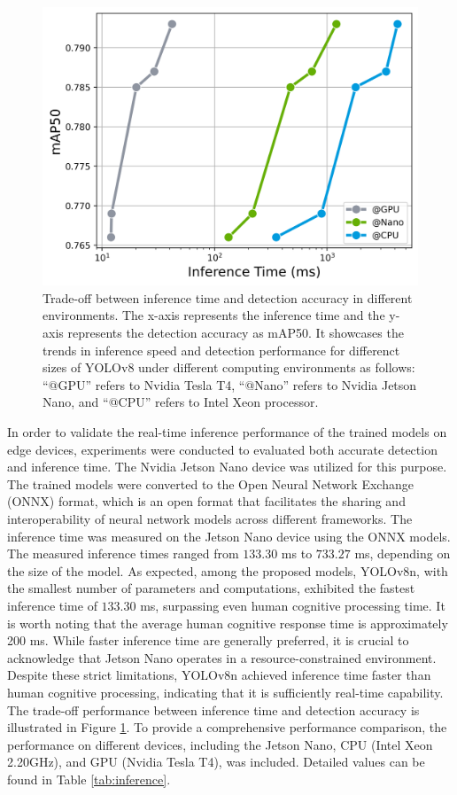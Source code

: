 \begin{figure}[!t]
    \includegraphics[scale=0.5]{fig/plot_inference_time.png}
    \caption{Trade-off between inference time and detection accuracy in different environments. The x-axis represents the inference time and the y-axis represents the detection accuracy as mAP50. It showcases the trends in inference speed and detection performance for differenct sizes of YOLOv8 under different computing environments as follows: ``@GPU'' refers to Nvidia Tesla T4, ``@Nano'' refers to Nvidia Jetson Nano, and ``@CPU'' refers to Intel Xeon processor.}
    \label{fig:inference}
\end{figure}



In order to validate the real-time inference performance of the trained models on edge devices, experiments were conducted to evaluated both accurate detection and inference time. 
The Nvidia Jetson Nano device was utilized for this purpose.
The trained models were converted to the Open Neural Network Exchange (ONNX) format, which is an open format that facilitates the sharing and interoperability of neural network models across different frameworks. The inference time was measured on the Jetson Nano device using the ONNX models.
The measured inference times ranged from $133.30$ ms to $733.27$ ms, depending on the size of the model.
As expected, among the proposed models, YOLOv8n, with the smallest number of parameters and computations, exhibited the fastest inference time of $133.30$ ms, surpassing even human cognitive processing time.
It is worth noting that the average human cognitive response time is approximately 200 ms.
While faster inference time are generally preferred, it is crucial to acknowledge that Jetson Nano operates in a resource-constrained environment.
Despite these strict limitations, YOLOv8n achieved inference time faster than human cognitive processing, indicating that it is sufficiently real-time capability.
The trade-off performance between inference time and detection accuracy is illustrated in Figure \ref{fig:inference}.
To provide a comprehensive performance comparison, the performance on different devices, including the Jetson Nano, CPU (Intel Xeon 2.20GHz), and GPU (Nvidia Tesla T4), was included.
Detailed values can be found in Table \ref{tab:inference}.

